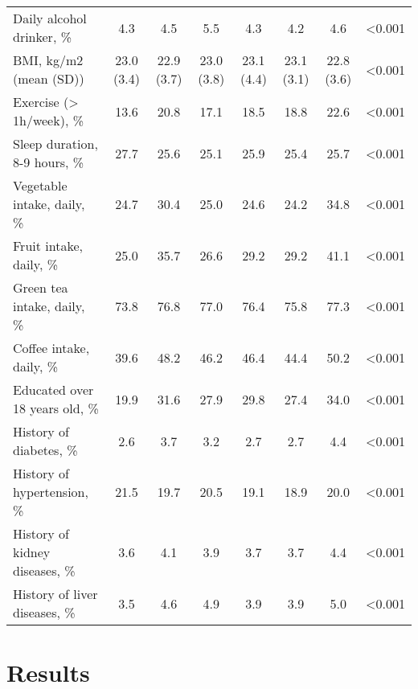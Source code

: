 \documentclass[nutrients,article,submit,moreauthors,pdftex]{mdpi}
\begin{document}
\begin{table}[h]
{\begin{tabular}[t]{lccccccc}
\hspace{1em}Daily alcohol drinker, \% & 4.3 & 4.5 & 5.5 & 4.3 & 4.2 & 4.6 & <0.001\\
\rowcolor{gray!6}  \hspace{1em}BMI, kg/m2 (mean (SD)) & 23.0 (3.4) & 22.9 (3.7) & 23.0 (3.8) & 23.1 (4.4) & 23.1 (3.1) & 22.8 (3.6) & <0.001\\
\hspace{1em}Exercise (> 1h/week), \% & 13.6 & 20.8 & 17.1 & 18.5 & 18.8 & 22.6 & <0.001\\
\rowcolor{gray!6}  \hspace{1em}Sleep duration, 8-9 hours, \% & 27.7 & 25.6 & 25.1 & 25.9 & 25.4 & 25.7 & <0.001\\
\hspace{1em}Vegetable intake, daily, \% & 24.7 & 30.4 & 25.0 & 24.6 & 24.2 & 34.8 & <0.001\\
\rowcolor{gray!6}  \hspace{1em}Fruit intake, daily, \% & 25.0 & 35.7 & 26.6 & 29.2 & 29.2 & 41.1 & <0.001\\
\hspace{1em}Green tea intake, daily, \% & 73.8 & 76.8 & 77.0 & 76.4 & 75.8 & 77.3 & <0.001\\
\rowcolor{gray!6}  \hspace{1em}Coffee intake, daily, \% & 39.6 & 48.2 & 46.2 & 46.4 & 44.4 & 50.2 & <0.001\\
\hspace{1em}Educated over 18 years old, \% & 19.9 & 31.6 & 27.9 & 29.8 & 27.4 & 34.0 & <0.001\\
\rowcolor{gray!6}  \hspace{1em}History of diabetes, \% & 2.6 & 3.7 & 3.2 & 2.7 & 2.7 & 4.4 & <0.001\\
\hspace{1em}History of hypertension, \% & 21.5 & 19.7 & 20.5 & 19.1 & 18.9 & 20.0 & <0.001\\
\rowcolor{gray!6}  \hspace{1em}History of kidney diseases, \% & 3.6 & 4.1 & 3.9 & 3.7 & 3.7 & 4.4 & <0.001\\
\hspace{1em}History of liver diseases, \% & 3.5 & 4.6 & 4.9 & 3.9 & 3.9 & 5.0 & <0.001\\
\bottomrule
\end{tabular}}
\end{table}

\hypertarget{results}{%
\section{Results}\label{results}}
\end{document}
